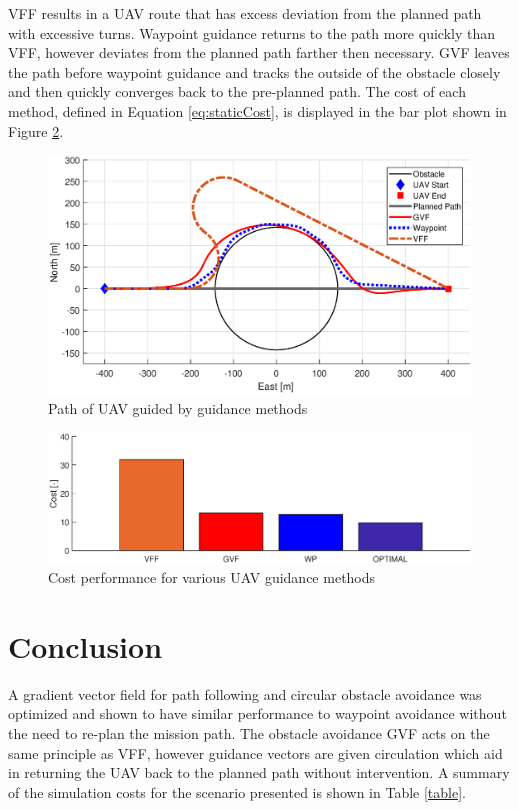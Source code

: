 \documentclass[conf]{new-aiaa}
\begin{document}
VFF results in a UAV route that has excess deviation from the planned path with excessive turns. Waypoint guidance returns to the path more quickly than VFF, however deviates from the planned path farther then necessary. GVF leaves the path before waypoint guidance and tracks the outside of the obstacle closely and then quickly converges back to the pre-planned path. The cost of each method, defined in Equation \ref{eq:staticCost}, is displayed in the bar plot shown in Figure \ref{fig:barplotperformance}.


\begin{figure}[H]
	\centering
	\includegraphics[trim=0 50 0 65,clip,width=15cm]{Figures/Simulations/compareMethods}
	\caption{Path of UAV guided by guidance methods}
	\label{fig:comparemethods}
\end{figure}


\begin{figure}[H]
	\centering
	\label{fig:barPlotCost}
	\includegraphics[width=15cm]{Figures/Simulations/barPlotPerformance}
	\caption{Cost performance for various UAV guidance methods}
	\label{fig:barplotperformance}
\end{figure}





\section{Conclusion}
A gradient vector field for path following and circular obstacle avoidance was optimized and shown to have similar performance to waypoint avoidance without the need to re-plan the mission path. The obstacle avoidance GVF acts on the same principle as VFF, however guidance vectors are given circulation which aid in returning the UAV back to the planned path without intervention. A summary of the simulation costs for the scenario presented is shown in Table \ref{table}.
\end{document}
